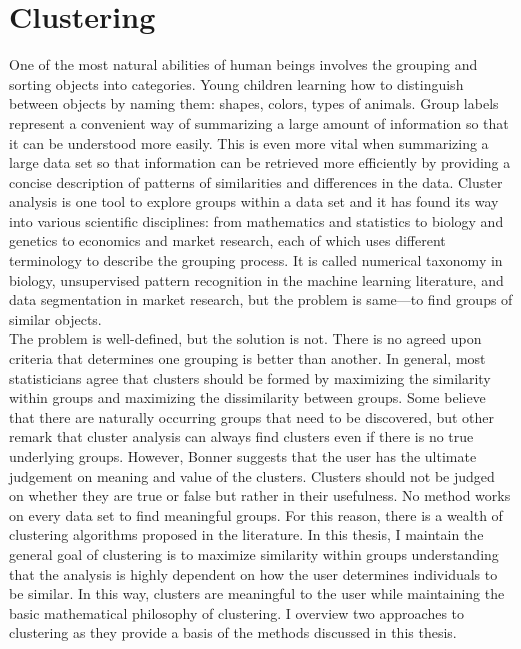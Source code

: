 \section{Clustering}
One of the most natural abilities of human beings involves the grouping and sorting objects into categories. Young children learning how to distinguish between objects by naming them: shapes, colors, types of animals. Group labels represent a convenient way of summarizing a large amount of information so that it can be understood more easily. This is even more vital when summarizing a large data set so that information can be retrieved more efficiently by providing a concise description of patterns of similarities and differences in the data. Cluster analysis is one tool to explore groups within a data set and it has found its way into various scientific disciplines: from mathematics and statistics to biology and genetics to economics and market research, each of which uses different terminology to describe the grouping process. It is called numerical taxonomy in biology, unsupervised pattern recognition in the machine learning literature, and data segmentation in market research, but the problem is same---to find groups of similar objects.\\

The problem is well-defined, but the solution is not. There is no agreed upon criteria that determines one grouping is better than another. In general, most statisticians agree that clusters should be formed by maximizing the similarity within groups and maximizing the dissimilarity between groups. Some believe that there are naturally occurring groups that need to be discovered, but other remark that cluster analysis can always find clusters even if there is no true underlying groups. However, Bonner \cite{bonner1964} suggests that the user has the ultimate judgement on meaning and value of the clusters. Clusters should not be judged on whether they are true or false but rather in their usefulness. No method works on every data set to find meaningful groups. For this reason, there is a wealth of clustering algorithms proposed in the literature. In this thesis, I maintain the general goal of clustering is to maximize similarity within groups understanding that the analysis is highly dependent on how the user determines individuals to be similar. In this way, clusters are meaningful to the user while maintaining the basic mathematical philosophy of clustering.  I overview two approaches to clustering as they provide a basis of the methods discussed in this thesis. 

